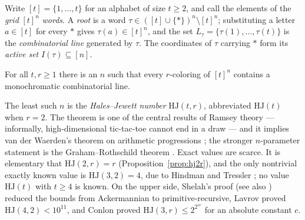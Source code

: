 \documentclass[12pt]{article}
\newcommand{\HJ}{\mathrm{HJ}}
\newcommand{\Ls}{L}
\begin{document}
Write $[t]=\{1,\dots,t\}$ for an alphabet of size $t\ge 2$, and call the
elements of the \emph{grid} $[t]^{n}$ \emph{words}. A \emph{root} is a word
$\tau\in([t]\cup\{*\})^{n}\setminus[t]^{n}$; substituting a letter
$a\in[t]$ for every $*$ gives $\tau(a)\in[t]^{n}$, and the set
$\Ls_{\tau}=\{\tau(1),\dots,\tau(t)\}$ is the \emph{combinatorial line}
generated by $\tau$. The coordinates of $\tau$ carrying $*$ form its
\emph{active set} $I(\tau)\subseteq[n]$.

\begin{theorem}
For all $t,r\ge 1$ there is an $n$ such that every $r$-coloring of
$[t]^{n}$ contains a monochromatic combinatorial line.
\end{theorem}

The least such $n$ is the \emph{Hales--Jewett number} $\HJ(t,r)$,
abbreviated $\HJ(t)$ when $r=2$. The theorem is one of the central results
of Ramsey theory --- informally, high-dimensional tic-tac-toe cannot end
in a draw --- and it implies van der Waerden's theorem on arithmetic
progressions \cite{vanderWaerden1927}; the stronger $n$-parameter
statement is the Graham--Rothschild theorem \cite{GR1971}. Exact values
are scarce. It is elementary that $\HJ(2,r)=r$
(Proposition~\ref{prop:hj2r}), and the only nontrivial exactly known value
is $\HJ(3,2)=4$, due to Hindman and Tressler
\cite{firstnontrivialHJ_is_4}; no value $\HJ(t)$ with $t\ge 4$ is known.
On the upper side, Shelah's proof \cite{s.proof_of_HJ} (see also
\cite{jungic_ramsey_notes,golshanimirabi2021}) reduced the bounds from
Ackermannian to primitive-recursive, Lavrov \cite{lavrov} proved
$\HJ(4,2)<10^{11}$, and Conlon
\cite{conlon2021monochromaticcombinatoriallineslength} proved
$\HJ(3,r)\le 2^{2^{cr}}$ for an absolute constant $c$.
\end{document}
